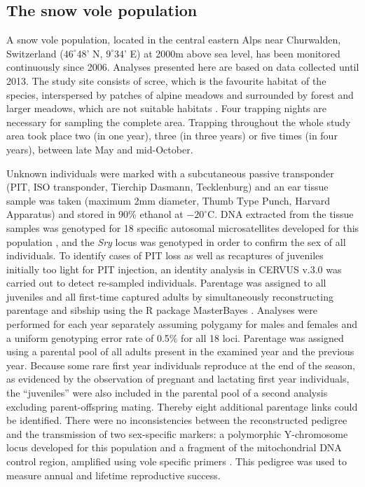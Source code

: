 \subsection{The snow vole population}\label{ap:snv}
A snow vole population, located in the central eastern Alps near Churwalden, Switzerland ($46^{\circ}$48' N, $9^{\circ}$34' E) at 2000m above sea level, has been monitored continuously since 2006. Analyses presented here are based on data collected until 2013. The study site consists of scree, which is the favourite habitat of the species, interspersed by patches of alpine meadows and surrounded by forest and larger meadows, which are not suitable habitats \parencite{Janeau1997}. Four trapping nights are necessary for sampling the complete area. Trapping throughout the whole study area took place two (in one year), three (in three years) or five times (in four years), between late May and mid-October. 

Unknown individuals were marked with a subcutaneous passive transponder (PIT, ISO transponder, Tierchip Dasmann, Tecklenburg) and an ear tissue sample was taken (maximum 2mm diameter, Thumb Type Punch, Harvard Apparatus) and stored in 90\% ethanol at $-20^{\circ}\mathrm{C}$. DNA extracted from the tissue samples was genotyped for 18 specific autosomal microsatellites developed for this population \parencite{Wandeler2008}, and the \textit{Sry} locus was genotyped in order to confirm the sex of all individuals. To identify cases of PIT loss as well as recaptures of juveniles initially too light for PIT injection, an identity analysis in CERVUS v.3.0 \parencite{Marshall1998} was carried out to detect re-sampled individuals.
Parentage was assigned to all juveniles and all first-time captured adults by simultaneously reconstructing parentage and sibship using the R package MasterBayes \parencite{Hadfield2006}. Analyses were performed for each year separately assuming polygamy for males and females and a uniform genotyping error rate of 0.5\% for all 18 loci. Parentage was assigned using a parental pool of all adults present in the examined year and the previous year. Because some rare first year individuals reproduce at the end of the season, as evidenced by the observation of pregnant and lactating first year individuals, the ``juveniles'' were also included in the parental pool of a second analysis excluding parent-offspring mating. Thereby eight additional parentage links could be identified. There were no inconsistencies between the reconstructed pedigree and the transmission of two sex-specific markers: a polymorphic Y-chromosome locus developed for this population \parencite{Wandeler2011} and a fragment of the mitochondrial DNA control region, amplified using vole specific primers \parencite{Haring2000}. This pedigree was used to measure annual and lifetime reproductive success.

